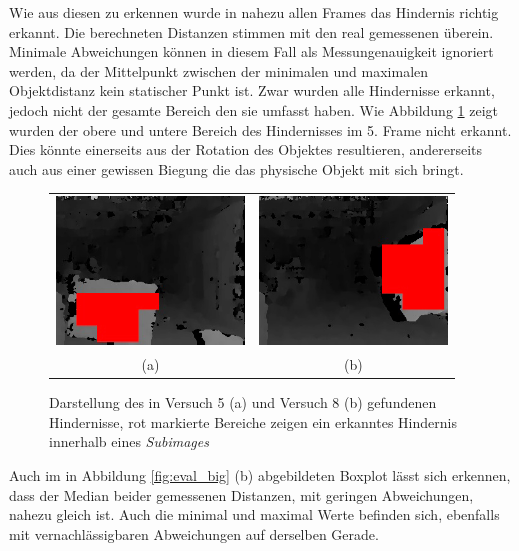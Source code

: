 \noindent
Wie aus diesen zu erkennen wurde in nahezu allen Frames das Hindernis richtig erkannt. Die berechneten Distanzen stimmen mit den real gemessenen überein. Minimale Abweichungen können in diesem Fall als Messungenauigkeit ignoriert werden, da der Mittelpunkt zwischen der minimalen und maximalen Objektdistanz kein statischer Punkt ist. Zwar wurden alle Hindernisse erkannt, jedoch nicht der gesamte Bereich den sie umfasst haben. Wie Abbildung \ref{fig:eval_big_fails} zeigt wurden der obere und untere Bereich des Hindernisses im 5. Frame nicht erkannt. Dies könnte einerseits aus der Rotation des Objektes resultieren, andererseits auch aus einer gewissen Biegung die das physische Objekt mit sich bringt.

\begin{figure}[h]
	\centering
	\begin{tabular}{cc}
	\includegraphics[width=5cm]{img/evaluation/_test_5_disparity}&
	\includegraphics[width=5cm]{img/evaluation/_test_8_disparity}\\
	(a) &  (b)
	\end{tabular}
	\caption{Darstellung des in Versuch 5 (a) und Versuch 8 (b) gefundenen Hindernisse, rot markierte Bereiche zeigen ein erkanntes Hindernis innerhalb eines \emph{Subimages} }
    \label{fig:eval_big_fails}
\end{figure}

\noindent
Auch im in Abbildung \ref{fig:eval_big} (b) abgebildeten Boxplot lässt sich erkennen, dass der Median beider gemessenen Distanzen, mit geringen Abweichungen, nahezu gleich ist. Auch die minimal und maximal Werte befinden sich, ebenfalls mit vernachlässigbaren Abweichungen auf derselben Gerade.\\

